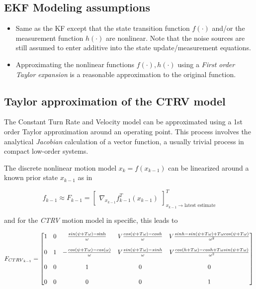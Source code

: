 \subsection{EKF Modeling assumptions}

\begin{itemize}
	\item Same as the KF except that the state transition function $f(\cdot)$ and/or the measurement function $h(\cdot)$ are nonlinear. Note that the noise sources are still assumed to enter additive into the state update/measurement equations.
	\item Approximating the nonlinear functions $f(\cdot),h(\cdot)$ using a  \emph{First order Taylor expansion} is a reasonable approximation to the original function.
\end{itemize}

\subsection{Taylor approximation of the CTRV model}

The Constant Turn Rate and Velocity model can be approximated using a 1st order Taylor approximation around an operating point. This process involves the analytical \emph{Jacobian} calculation of a vector function, a usually trivial process in compact low-order systems.


The discrete nonlinear motion model $x_{k} = f({x}_{k-1})$ can be linearized around a known prior state $x_{k-1}$ as in 




\begin{equation}
\label{eq:linearization_jacob}
f_{k-1} \approx F_{k-1} =
\begin{bmatrix}
\nabla_{x_{k-1}} f_{k-1}^{T}(x_{k-1})
\end{bmatrix}_{x_{k-1} \rightarrow\text{latest estimate}}^{T}
\end{equation}


and for the \emph{CTRV} motion model in specific, this leads to 




\begin{equation}
\label{eq:linearization_mot_model}
F_{{CTRV}_{k-1}} =
\begin{bmatrix}1 &0 &\frac{sin({\psi}+T\omega) - \sinh}{\omega} & {V} \frac{cos({\psi}+T\omega)-cosh}{\omega} & {V}\frac{sinh -sin({\psi}+T\omega) + T\omega cos({\psi}+T\omega)}{\omega^{2}}\\\\
0 &1 &-\frac{cos({\psi}+T\omega) - cos(\omega)}{\omega} &{V} \frac{sin({\psi}+T\omega)-sinh}{\omega} & {V}\frac{cos(h + T\omega) -cosh + T\omega sin({\psi}+T\omega)}{\omega^{2}}\\\\
0 &0 &1 &0 &0 \\\\
0 &0 &0 &0 &1\end{bmatrix}
\end{equation}


